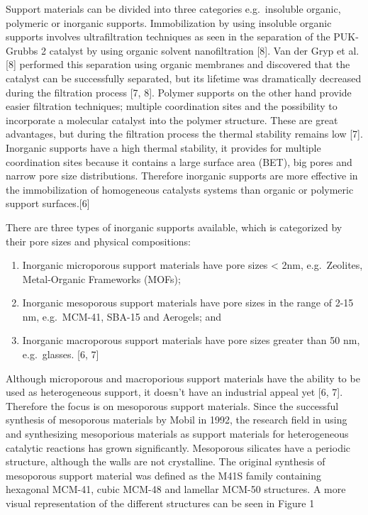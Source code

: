 \documentclass[]{article}
\providecommand{\tightlist}{%
  \setlength{\itemsep}{0pt}\setlength{\parskip}{0pt}}
\begin{document}
Support materials can be divided into three categories e.g.~insoluble
organic, polymeric or inorganic supports. Immobilization by using
insoluble organic supports involves ultrafiltration techniques as seen
in the separation of the PUK-Grubbs 2 catalyst by using organic solvent
nanofiltration {[}8{]}. Van der Gryp et al. {[}8{]} performed this
separation using organic membranes and discovered that the catalyst can
be successfully separated, but its lifetime was dramatically decreased
during the filtration process {[}7, 8{]}. Polymer supports on the other
hand provide easier filtration techniques; multiple coordination sites
and the possibility to incorporate a molecular catalyst into the polymer
structure. These are great advantages, but during the filtration process
the thermal stability remains low {[}7{]}. Inorganic supports have a
high thermal stability, it provides for multiple coordination sites
because it contains a large surface area (BET), big pores and narrow
pore size distributions. Therefore inorganic supports are more effective
in the immobilization of homogeneous catalysts systems than organic or
polymeric support surfaces.{[}6{]}

There are three types of inorganic supports available, which is
categorized by their pore sizes and physical compositions:

\begin{enumerate}
\def\labelenumi{\arabic{enumi}.}
\tightlist
\item
  Inorganic microporous support materials have pore sizes \textless{}
  2nm, e.g.~Zeolites, Metal-Organic Frameworks (MOFs);
\item
  Inorganic mesoporous support materials have pore sizes in the range of
  2-15 nm, e.g.~MCM-41, SBA-15 and Aerogels; and
\item
  Inorganic macroporous support materials have pore sizes greater than
  50 nm, e.g.~glasses. {[}6, 7{]}
\end{enumerate}

Although microporous and macroporious support materials have the ability
to be used as heterogeneous support, it doesn't have an industrial
appeal yet {[}6, 7{]}. Therefore the focus is on mesoporous support
materials. Since the successful synthesis of mesoporous materials by
Mobil in 1992, the research field in using and synthesizing mesoporious
materials as support materials for heterogeneous catalytic reactions has
grown significantly. Mesoporous silicates have a periodic structure,
although the walls are not crystalline. The original synthesis of
mesoporous support material was defined as the M41S family containing
hexagonal MCM-41, cubic MCM-48 and lamellar MCM-50 structures. A more
visual representation of the different structures can be seen in Figure
1
\end{document}
